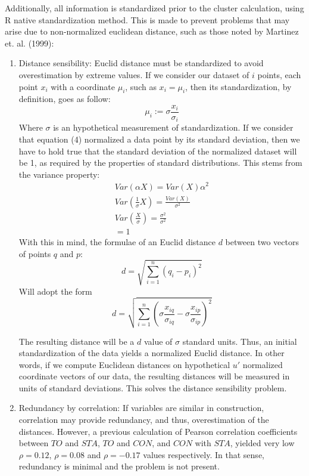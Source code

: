 \documentclass[12pt,a4paper]{article}
\begin{document}
Additionally, all information is standardized prior to the cluster calculation, using R native standardization method. This is made to prevent problems that may arise due to non-normalized euclidean distance, such as those noted by Martinez et. al. (1999):
\begin{enumerate}
	\item Distance sensibility: Euclid distance must be standardized to avoid overestimation by extreme values. If we consider our dataset of $i$ points, each point $x_{i}$ with a coordinate $\mu_{i}$, such as $x_{i} = \mu_{i}$, then its standardization, by definition, goes as follow:
	\begin{equation}
		\mu_{i} := \sigma \frac{x_{i}}{\sigma_{i}}
	\end{equation}
	Where $\sigma$ is an hypothetical measurement of standardization. If we consider that equation (4) normalized a data point by its standard deviation, then we have to hold true that the standard deviation of the normalized dataset will be 1, as required by the properties of standard distributions. This stems from the variance property:
	\begin{equation}
	\begin{split}
		Var(\alpha X) = Var(X)\alpha^2 \\
		Var(\frac{1}{\sigma} X) = \frac{Var(X)}{\sigma^2} \\
	    Var(\frac{X}{\sigma}) = \frac{\sigma^2}{\sigma^2} \\
	    = 1
	\end{split}
	\end{equation}
	With this in mind, the formulae of an Euclid distance $d$ between two vectors of points $q$ and $p$:
	\begin{equation}
		d = \sqrt{\sum_{i = 1}^{n}(q_{i}-p_{i})^2}
	\end{equation}
	Will adopt the form
	\begin{equation}
		d = \sqrt{\sum_{i = 1}^{n}(\sigma \frac{x_{iq}}{\sigma_{iq}} - \sigma \frac{x_{ip}}{\sigma_{ip} })^2}
	\end{equation}

	The resulting distance will be a $d$ value of $\sigma$ standard units. Thus, an initial standardization of the data yields a normalized Euclid distance. In other words, if we compute Euclidean distances on hypothetical $u'$ normalized coordinate vectors of our data, the resulting distances will be measured in units of standard deviations. This solves the distance sensibility problem.
	
	\item Redundancy by correlation: If variables are similar in construction, correlation may provide redundancy, and thus, overestimation of the distances. However, a previous calculation of Pearson correlation coefficients between $TO$ and $STA$, $TO$ and $CON$, and $CON$ with $STA$, yielded very low $\rho = 0.12$, $\rho = 0.08$ and $\rho = -0.17$ values respectively. In that sense, redundancy is minimal and the problem is not present.
\end{enumerate}
\end{document}
